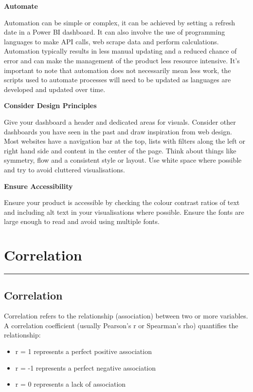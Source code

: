 \documentclass[
]{book}
\providecommand{\tightlist}{%
  \setlength{\itemsep}{0pt}\setlength{\parskip}{0pt}}
\begin{document}
\textbf{Automate }

Automation can be simple or complex, it can be achieved by setting a refresh date in a Power BI dashboard. It can also involve the use of programming languages to make API calls, web scrape data and perform calculations. Automation typically results in less manual updating and a reduced chance of error and can make the management of the product less resource intensive. It's important to note that automation does not necessarily mean less work, the scripts used to automate processes will need to be updated as languages are developed and updated over time.

\textbf{Consider Design Principles}

Give your dashboard a header and dedicated areas for visuals. Consider other dashboards you have seen in the past and draw inspiration from web design. Most websites have a navigation bar at the top, lists with filters along the left or right hand side and content in the center of the page. Think about things like symmetry, flow and a consistent style or layout. Use white space where possible and try to avoid cluttered visualisations.

\textbf{Ensure Accessibility}

Ensure your product is accessible by checking the colour contrast ratios of text and including alt text in your visualisations where possible. Ensure the fonts are large enough to read and avoid using multiple fonts.

\hypertarget{correlation-1}{%
\chapter{Correlation}\label{correlation-1}}

\begin{center}\rule{0.5\linewidth}{0.5pt}\end{center}

\hypertarget{correlation-2}{%
\section{Correlation}\label{correlation-2}}

Correlation refers to the relationship (association) between two or more variables. A correlation coefficient (usually Pearson's r or Spearman's rho) quantifies the relationship:

\begin{itemize}
\tightlist
\item
  r = 1 represents a perfect positive association
\item
  r = -1 represents a perfect negative association
\item
  r = 0 represents a lack of association
\end{itemize}
\end{document}
